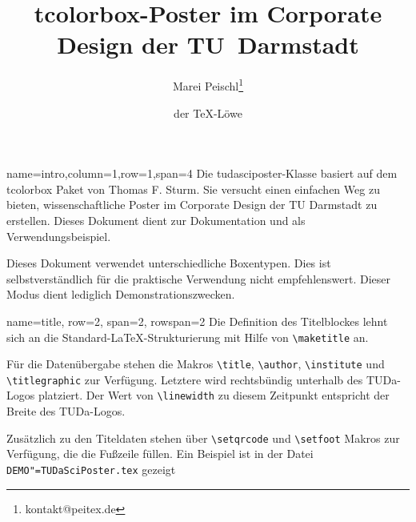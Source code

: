 \documentclass[
	accentcolor=9c,
	]{tudasciposter}
\newcommand{\tbs}{\textbackslash}
\let\code\texttt
\newcommand*{\macro}[1]{\code{\tbs#1}}
\let\file\texttt
\let\pck\textsf
\let\cls\textsf
\begin{document}
\title{\pck{tcolorbox}-Poster im Corporate Design der TU~Darmstadt}
\author{Marei Peischl\inst{*}\thanks{kontakt@peitex.de} \and der \TeX-Löwe}


\begin{tcbposter}[
	poster={
		columns=4,
		rows=7,
		spacing=1cm,
	},]

\begin{posterboxenv}[title=Zusammenfassung]{name=intro,column=1,row=1,span=4}
	Die \cls{tudasciposter}-Klasse basiert auf dem \pck{tcolorbox} Paket von Thomas F. Sturm.
	Sie versucht einen einfachen Weg zu bieten, wissenschaftliche Poster im Corporate Design der TU Darmstadt zu erstellen. Dieses Dokument dient zur Dokumentation und als Verwendungsbeispiel.

	Dieses Dokument verwendet unterschiedliche Boxentypen. Dies ist selbstverständlich für die praktische Verwendung nicht empfehlenswert. Dieser Modus dient lediglich Demonstrationszwecken.
\end{posterboxenv}

\begin{posterboxenv}[title=Titelei]{name=title, row=2, span=2, rowspan=2}
	Die Definition des Titelblockes lehnt sich an die Standard-\LaTeX{}-Strukturierung  mit Hilfe von \macro{maketitle} an.

	Für die Datenübergabe stehen die Makros \macro{title}, \macro{author}, \macro{institute} und \macro{titlegraphic} zur Verfügung. Letztere wird rechtsbündig  unterhalb des TUDa-Logos platziert. Der Wert von \macro{linewidth} zu diesem Zeitpunkt entspricht der Breite des TUDa-Logos.

	Zusätzlich zu den Titeldaten stehen über \macro{setqrcode} und \macro{setfoot} Makros zur Verfügung, die die Fußzeile füllen.
	Ein Beispiel ist in der Datei \file{DEMO"=TUDaSciPoster.tex} gezeigt
\end{posterboxenv}


\end{tcbposter}
\end{document}
